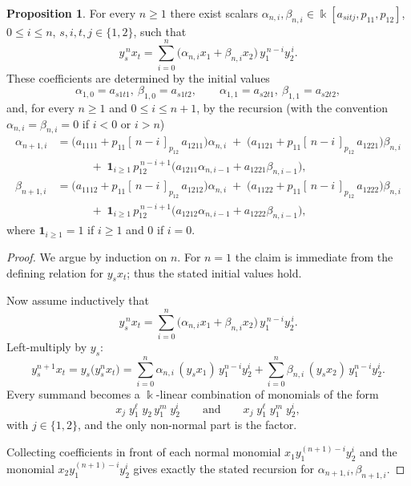 \documentclass{amsart}
\theoremstyle{definition}
\newtheorem{proposition}[theorem]{Proposition}
\theoremstyle{remark}
\numberwithin{equation}{section}
\begin{document}
\begin{proposition}\label{propfi} For every $n\ge1$ there exist scalars $\alpha_{n,i},\beta_{n,i}\in \Bbbk[a_{sitj},p_{11},p_{12}]$, $0\le i\le n$, $s, i, t, j \in \{1,2\}$, such that 
\[
y_s^{\,n}x_t=\sum_{i=0}^{n}\big(\alpha_{n,i}x_1+\beta_{n,i}x_2\big)\,y_1^{\,n-i}y_2^{\,i}.
\]
These coefficients are determined by the initial values
\[
\alpha_{1,0}=a_{s1t1},\ \beta_{1,0}=a_{s1t2},\qquad
\alpha_{1,1}=a_{s2t1},\ \beta_{1,1}=a_{s2t2},
\]
and, for every $n\ge1$ and $0\le i\le n+1$, by the recursion (with the convention
$\alpha_{n,i}=\beta_{n,i}=0$ if $i<0$ or $i>n$)
\[
\begin{aligned}
\alpha_{n+1,i}
&=\Big(a_{1111}+p_{11}[\,n-i\,]_{p_{12}}\,a_{1211}\Big)\alpha_{n,i}
 \;+\;\Big(a_{1121}+p_{11}[\,n-i\,]_{p_{12}}\,a_{1221}\Big)\beta_{n,i}\\
&\qquad\quad+\;\mathbf{1}_{i\ge1}\,p_{12}^{\,n-i+1}\Big(a_{1211}\alpha_{n,i-1}+a_{1221}\beta_{n,i-1}\Big),\\[0.6em]
\beta_{n+1,i}
&=\Big(a_{1112}+p_{11}[\,n-i\,]_{p_{12}}\,a_{1212}\Big)\alpha_{n,i}
 \;+\;\Big(a_{1122}+p_{11}[\,n-i\,]_{p_{12}}\,a_{1222}\Big)\beta_{n,i}\\
&\qquad\quad+\;\mathbf{1}_{i\ge1}\,p_{12}^{\,n-i+1}\Big(a_{1212}\alpha_{n,i-1}+a_{1222}\beta_{n,i-1}\Big),
\end{aligned}
\]
where $\mathbf{1}_{i\ge1}=1$ if $i\ge1$ and $0$ if $i=0$.
\end{proposition}

\begin{proof}
We argue by induction on $n$. For $n=1$ the claim is immediate from the defining relation for $y_sx_t$; thus the stated initial values hold.

Now assume inductively that
\[
y_s^{\,n}x_t=\sum_{i=0}^{n}\big(\alpha_{n,i}x_1+\beta_{n,i}x_2\big)\,y_1^{\,n-i}y_2^{\,i}.
\]
Left-multiply by $y_s$:
\[
y_s^{n+1}x_t
= y_s\big(y_s^n x_t\big)
=\sum_{i=0}^n \alpha_{n,i}\,(y_sx_1)\,y_1^{n-i}y_2^i
+\sum_{i=0}^n \beta_{n,i}\,(y_sx_2)\,y_1^{n-i}y_2^i.
\]
Every summand becomes a $\Bbbk$-linear combination of monomials of the form
\[
x_j\;y_1^{\ell}\;y_2\,y_1^{m}\;y_2^i
\qquad\text{and}\qquad
x_j\;y_1^{\ell}\;y_1^{m}\;y_2^i,
\]
with $j\in\{1,2\}$, and the only non-normal part is the factor.

Collecting coefficients in front of each normal monomial
$x_1y_1^{(n+1)-i}y_2^i$ and the monomial $x_2y_1^{(n+1)-i}y_2^i$
gives exactly the stated recursion for $\alpha_{n+1,i},\beta_{n+1,i}$.
\end{proof}
\end{document}

